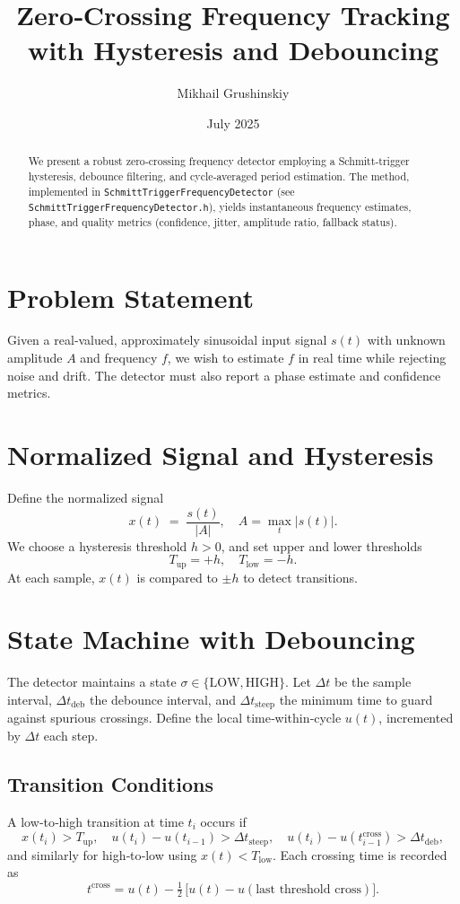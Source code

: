 \documentclass[11pt,letterpaper]{article}
\begin{document}
\title{Zero‐Crossing Frequency Tracking with Hysteresis and Debouncing}
\author{Mikhail Grushinskiy}
\date{July 2025}
\maketitle

\begin{abstract}
We present a robust zero‐crossing frequency detector employing a Schmitt‐trigger hysteresis, debounce filtering, and cycle‐averaged period estimation.  The method, implemented in \texttt{SchmittTriggerFrequencyDetector} (see \texttt{SchmittTriggerFrequencyDetector.h}), yields instantaneous frequency estimates, phase, and quality metrics (confidence, jitter, amplitude ratio, fallback status).
\end{abstract}

\section{Problem Statement}
Given a real‐valued, approximately sinusoidal input signal \(s(t)\) with unknown amplitude \(A\) and frequency \(f\), we wish to estimate \(f\) in real time while rejecting noise and drift.  The detector must also report a phase estimate and confidence metrics.

\section{Normalized Signal and Hysteresis}
Define the normalized signal
\[
x(t) \;=\; \frac{s(t)}{\lvert A\rvert}, 
\quad A = \max_t |s(t)|.
\]
We choose a hysteresis threshold \(h>0\), and set upper and lower thresholds
\[
T_{\mathrm{up}} = +h,\quad T_{\mathrm{low}} = -h.
\]
At each sample, \(x(t)\) is compared to \(\pm h\) to detect transitions.

\section{State Machine with Debouncing}
The detector maintains a state \(\sigma \in \{\mathrm{LOW}, \mathrm{HIGH}\}\).  Let \(\Delta t\) be the sample interval, \(\Delta t_{\mathrm{deb}}\) the debounce interval, and \(\Delta t_{\mathrm{steep}}\) the minimum time to guard against spurious crossings.  Define the local time‐within‐cycle \(u(t)\), incremented by \(\Delta t\) each step.

\subsection{Transition Conditions}
A low‐to‐high transition at time \(t_i\) occurs if
\[
x(t_i) > T_{\mathrm{up}}, 
\quad u(t_i) - u(t_{i-1}) > \Delta t_{\mathrm{steep}}, 
\quad u(t_i) - u(t_{i-1}^{\mathrm{cross}}) > \Delta t_{\mathrm{deb}},
\]
and similarly for high‐to‐low using \(x(t) < T_{\mathrm{low}}\).  Each crossing time is recorded as
\[
t^{\mathrm{cross}} = u(t) - \tfrac12\,\bigl[u(t)-u(\text{last threshold cross})\bigr].
\]
\end{document}
